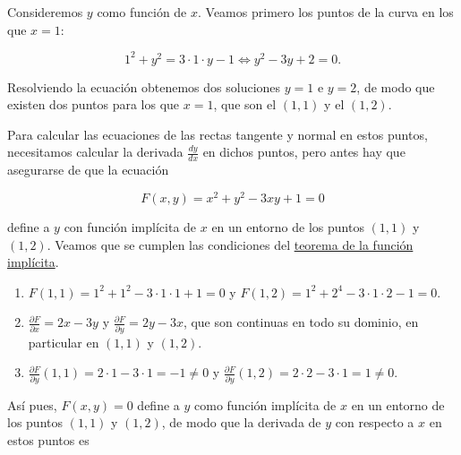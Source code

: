 \documentclass[
  spanish,
  a4paper,
]{scrreport}
\providecommand{\tightlist}{%
  \setlength{\itemsep}{0pt}\setlength{\parskip}{0pt}}
\theoremstyle{definition}
\theoremstyle{remark}
\begin{document}
\begin{tcolorbox}[enhanced jigsaw, arc=.35mm, bottomrule=.15mm, bottomtitle=1mm, breakable, colback=white, colbacktitle=quarto-callout-tip-color!10!white, colframe=quarto-callout-tip-color-frame, coltitle=black, left=2mm, leftrule=.75mm, opacityback=0, opacitybacktitle=0.6, rightrule=.15mm, title=\textcolor{quarto-callout-tip-color}{\faLightbulb}\hspace{0.5em}{Solución}, titlerule=0mm, toprule=.15mm, toptitle=1mm]

Consideremos \(y\) como función de \(x\). Veamos primero los puntos de
la curva en los que \(x=1\):

\[
1^{2}+y^{2} = 3\cdot 1\cdot y-1 \Leftrightarrow y^{2} -3y+2 = 0.
\]

Resolviendo la ecuación obtenemos dos soluciones \(y=1\) e \(y=2\), de
modo que existen dos puntos para los que \(x=1\), que son el \((1,1)\) y
el \((1,2)\).

Para calcular las ecuaciones de las rectas tangente y normal en estos
puntos, necesitamos calcular la derivada \(\frac{dy}{dx}\) en dichos
puntos, pero antes hay que asegurarse de que la ecuación

\[
F(x,y) = x^2 + y^2 - 3xy + 1 = 0
\]

define a \(y\) con función implícita de \(x\) en un entorno de los
puntos \((1, 1)\) y \((1, 2)\). Veamos que se cumplen las condiciones
del
\href{https://aprendeconalf.es/analisis-manual/13-derivadas-funciones-varias-variables.html\#thm-funcion-implicita}{teorema
de la función implícita}.

\begin{enumerate}
\def\labelenumi{\alph{enumi}.}
\tightlist
\item
  \(F(1,1) = 1^2 + 1^2 - 3\cdot 1\cdot 1 + 1 = 0\) y
  \(F(1,2) = 1^2 + 2^4 - 3\cdot 1\cdot 2 -1 =0\).
\item
  \(\frac{\partial F}{\partial x}=2x-3y\) y
  \(\frac{\partial F}{\partial y}=2y-3x\), que son continuas en todo su
  dominio, en particular en \((1,1)\) y \((1,2)\).
\item
  \(\frac{\partial F}{\partial y}(1,1) = 2\cdot 1-3\cdot 1 = -1\neq 0\)
  y
  \(\frac{\partial F}{\partial y}(1,2) = 2\cdot 2-3\cdot 1 = 1\neq 0\).
\end{enumerate}

Así pues, \(F(x,y)=0\) define a \(y\) como función implícita de \(x\) en
un entorno de los puntos \((1,1)\) y \((1,2)\), de modo que la derivada
de \(y\) con respecto a \(x\) en estos puntos es


\end{tcolorbox}
\end{document}
